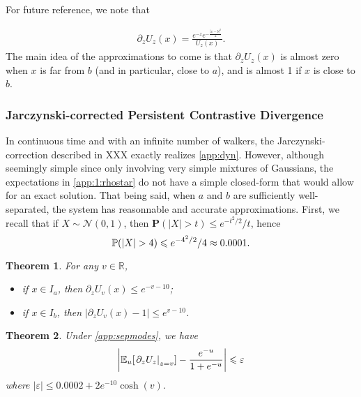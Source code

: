 \documentclass[a4paper,11pt]{extarticle}
\newtheorem{theorem}{Theorem}
\begin{document}
For future reference, we note that 
    
\begin{align}
    \partial_z U_z(x) = \frac{e^{-z}e^{ - \frac{|x-b|^2}{2}}}{U_z(x)}. 
\end{align}
The main idea of the approximations to come is that $\partial_z U_z(x)$ is almost zero when $x$ is far from $b$ (and in particular, close to $a$), and is almost 1 if $x$ is close to $b$. 



\subsubsection*{Jarczynski-corrected Persistent Contrastive Divergence}

In continuous time and with an infinite number of walkers, the Jarczynski-correction described in XXX exactly realizes \eqref{app:dyn}. However, although seemingly simple since only involving very simple mixtures of Gaussians, the expectations in \eqref{app:1:rhostar} do not have a simple closed-form that would allow for an exact solution. That being said, when $a$ and $b$ are sufficiently well-separated, the system has reasonnable and accurate approximations. First, we recall that if $X\sim \mathcal{N}(0,1)$, then $\mathbf{P}(|X|>t)\leqslant e^{-t^2/2}/t$, hence
\begin{equation}
    \label{app:deviation_gaussian}
    \PP(|X|>4)\leqslant e^{-4^2/2}/4 \approx 0.0001. 
\end{equation}


\begin{theorem}\label{app:lemm:ineq}For any $v\in\mathbb{R}$, \begin{itemize}
\item if $x\in I_a$, then $\partial_z U_v(x)\leqslant e^{-v-10}$; 
\item if $x\in I_b$, then $|\partial_z U_v(x) - 1| \leqslant e^{v-10}$.  
\end{itemize}
\end{theorem}

\begin{theorem}Under \eqref{app:sepmodes}, we have  
    \begin{equation}\label{app:approx}
        \left|\mathbb{E}_u [\left. \partial_z U_z \right|_{z=v}] - \frac{e^{-u}}{1 + e^{-u}}\right| \leqslant \varepsilon
    \end{equation}
    where $|\varepsilon|\leqslant 0.0002 + 2e^{-10}\cosh(v)$. 
\end{theorem}
\end{document}

